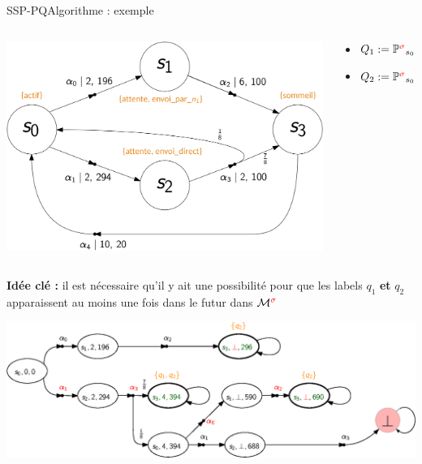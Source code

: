 \documentclass[compress]{beamer}
\theoremstyle{theorem}%
\begin{document}
\begin{frame}{SSP-PQ}{Algorithme : exemple}
    \begin{columns}
      \begin{column}{0.3\linewidth}
        \includegraphics[width=\linewidth]{resources/mdmdp2}
      \end{column}
      \begin{column}{0.7\linewidth}{\small
        \begin{itemize}
          \item $Q_1 := \mathbb{P}^{\color{red}\sigma}_{s_0}(\Diamond_{1\, :\, \leq 4} \text{ sommeil}) \geq 0.8$
          \item $Q_2 := \mathbb{P}^{\color{red}\sigma}_{s_0}(\Diamond_{2\, :\, \leq 700} \text{ sommeil}) \geq 0.9$
        \end{itemize}
        }
      \end{column}
    \end{columns}
  \vspace{0.04\linewidth}
  {\small \textbf{\color{fibeamer@orange}Idée clé : } il est nécessaire qu'il y ait une possibilité pour que les labels {\color{DarkOrange}$q_1$} \textbf{et} {\color{DarkOrange}$q_2$} apparaissent au moins une fois dans le futur dans $\mathcal{M}^{\color{red}\sigma}$}
  \vspace{-0.02\linewidth}
  \begin{center}
    \includegraphics[width=\linewidth]{resources/SSP-PQ-unfolding}
  \end{center}
\end{frame}
\end{document}
